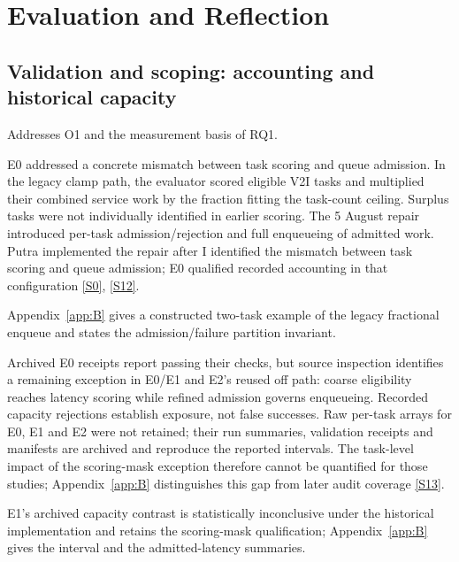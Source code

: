 \documentclass[12pt,a4paper]{article}
\begin{document}
\FloatBarrier
\section{Evaluation and Reflection}\label{sec:3}

\FloatBarrier
\subsection{Validation and scoping: accounting and historical capacity}\label{sec:3.1}

Addresses O1 and the measurement basis of RQ1.

E0 addressed a concrete mismatch between task scoring and queue admission. In the legacy clamp path, the evaluator scored eligible V2I tasks and multiplied their combined service work by the fraction fitting the task-count ceiling. Surplus tasks were not individually identified in earlier scoring. The 5 August repair introduced per-task admission/rejection and full enqueueing of admitted work. Putra implemented the repair after I identified the mismatch between task scoring and queue admission; E0 qualified recorded accounting in that configuration \hyperref[source-s0]{[S0]}, \hyperref[source-s12]{[S12]}.

Appendix~\ref{app:B} gives a constructed two-task example of the legacy fractional enqueue and states the admission/failure partition invariant.

Archived E0 receipts report passing their checks, but source inspection identifies a remaining exception in E0/E1 and E2's reused off path: coarse eligibility reaches latency scoring while refined admission governs enqueueing. Recorded capacity rejections establish exposure, not false successes. Raw per-task arrays for E0, E1 and E2 were not retained; their run summaries, validation receipts and manifests are archived and reproduce the reported intervals. The task-level impact of the scoring-mask exception therefore cannot be quantified for those studies; Appendix~\ref{app:B} distinguishes this gap from later audit coverage \hyperref[source-s13]{[S13]}.

E1's archived capacity contrast is statistically inconclusive under the historical implementation and retains the scoring-mask qualification; Appendix~\ref{app:B} gives the interval and the admitted-latency summaries.
\end{document}
